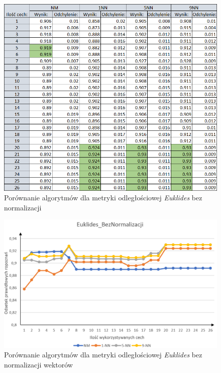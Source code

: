 \documentclass[12pt]{article}
\begin{document}
\begin{figure}[H]
	\centering
		\includegraphics[scale=0.8]{images/algorithms/euklides_beznorm_tab.png}
	\caption{Porównanie algorytmów dla metryki odległościowej \textit{Euklides} bez normalizacji}
\end{figure}
\begin{figure}[H]
	\centering
		\includegraphics[scale=0.66]{images/algorithms/euklides_beznorm.png}
	\caption{Porównanie algorytmów dla metryki odległościowej \textit{Euklides} bez normalizacji wektorów}
\end{figure}
\end{document}
